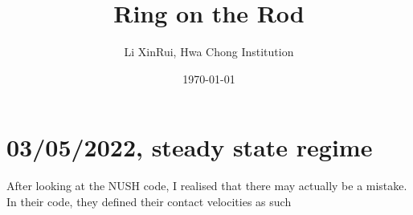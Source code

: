 \documentclass{scrartcl}
\begin{document}
\title{Ring on the Rod}
\author{Li XinRui, Hwa Chong Institution}
\date{\today}
\setlength\parindent{0pt}


\maketitle

\section{03/05/2022, steady state regime}
After looking at the NUSH code, I realised that there may actually be a mistake. In their code, they defined their contact velocities as such
\end{document}
